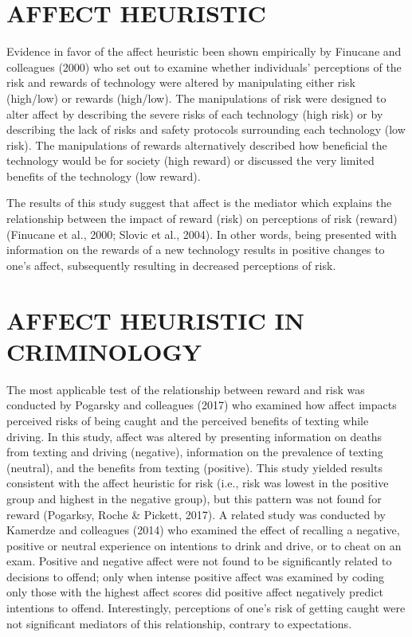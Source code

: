 \documentclass{article} %
\begin{document}
\section{AFFECT HEURISTIC}

Evidence in favor of the affect heuristic been shown empirically by Finucane and colleagues (2000) who set out to examine whether individuals’ perceptions of the risk and rewards of technology were altered by manipulating either risk (high/low) or rewards (high/low).  The manipulations of risk were designed to alter affect by describing the severe risks of each technology (high risk) or by describing the lack of risks and safety protocols surrounding each technology (low risk). The manipulations of rewards alternatively described how beneficial the technology would be for society (high reward) or discussed the very limited benefits of the technology (low reward).

The results of this study suggest that affect is the mediator which explains the relationship between the impact of reward (risk) on perceptions of risk (reward) (Finucane et al., 2000; Slovic et al., 2004). In other words, being presented with information on the rewards of a new technology results in positive changes to one’s affect, subsequently resulting in decreased perceptions of risk. 

\section{AFFECT HEURISTIC IN CRIMINOLOGY}

The most applicable test of the relationship between reward and risk was conducted by Pogarsky and colleagues (2017) who examined how affect impacts perceived risks of being caught and the perceived benefits of texting while driving. In this study, affect was altered by presenting information on deaths from texting and driving (negative), information on the prevalence of texting (neutral), and the benefits from texting (positive). This study yielded results consistent with the affect heuristic for risk (i.e., risk was lowest in the positive group and highest in the negative group), but this pattern was not found for reward (Pogarksy, Roche & Pickett, 2017). A related study was conducted by Kamerdze and colleagues (2014) who examined the effect of recalling a negative, positive or neutral experience on intentions to drink and drive, or to cheat on an exam. Positive and negative affect were not found to be significantly related to decisions to offend; only when intense positive affect was examined by coding only those with the highest affect scores did positive affect negatively predict intentions to offend. Interestingly, perceptions of one’s risk of getting caught were not significant mediators of this relationship, contrary to expectations.
\end{document}
